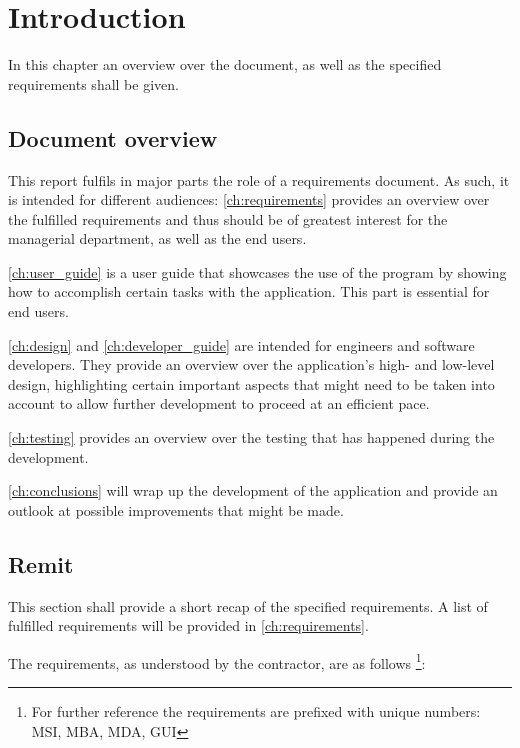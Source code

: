 \chapter{Introduction}\label{ch:introduction}

In this chapter an overview over the document, as well as the specified requirements shall be given.

\section{Document overview}
\label{sec:document_overview}

This report fulfils in major parts the role of a requirements document. As such, it is intended for different audiences:
\autoref{ch:requirements} provides an overview over the fulfilled requirements and thus should be of greatest interest for the managerial department, as well as the end users.

\autoref{ch:user_guide} is a user guide that showcases the use of the program by showing how to accomplish certain tasks with the application. This part is essential for end users.

\autoref{ch:design} and \autoref{ch:developer_guide} are intended for engineers and software developers. They provide an overview over the application's high- and low-level design, highlighting certain important aspects that might need to be taken into account to allow further development to proceed at an efficient pace.

\autoref{ch:testing} provides an overview over the testing that has happened during the development.

\autoref{ch:conclusions} will wrap up the development of the application and provide an outlook at possible improvements that might be made.

\section{Remit}
\label{sec:remit}

This section shall provide a short recap of the specified requirements. A list of fulfilled requirements will be provided in \autoref{ch:requirements}.

The requirements, as understood by the contractor, are as follows \footnote{For further reference the requirements are prefixed with unique numbers: \ac{MSI}, \ac{MBA}, \ac{MDA}, \ac{GUI}}:

